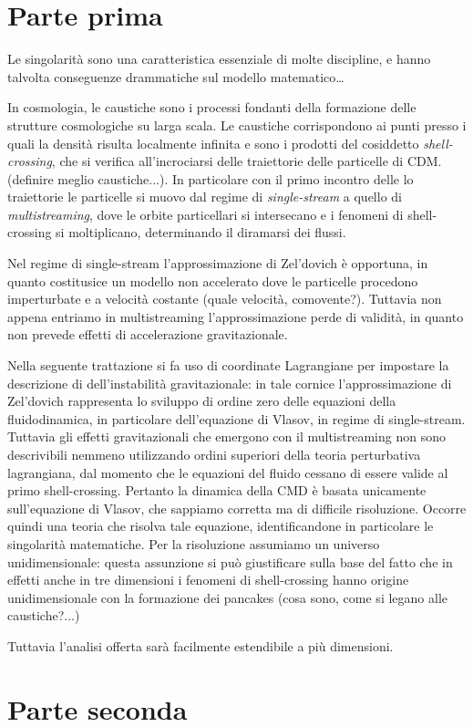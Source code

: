 \section{Parte prima}

Le singolarità sono una caratteristica essenziale di molte discipline, e hanno talvolta conseguenze
drammatiche sul modello matematico\dots

In cosmologia, le caustiche sono i processi fondanti della formazione delle strutture cosmologiche
su larga scala. Le caustiche corrispondono ai punti presso i quali la densità risulta localmente infinita
e sono i prodotti del cosiddetto \textit{shell-crossing}, che si verifica all'incrociarsi delle traiettorie
delle particelle di CDM. (definire meglio caustiche...).
In particolare con il primo incontro delle lo traiettorie le particelle si muovo dal regime di \textit{single-stream}
a quello di \textit{multistreaming}, dove le orbite particellari si intersecano e i fenomeni di shell-crossing
si moltiplicano, determinando il diramarsi dei flussi.

Nel regime di single-stream l'approssimazione di Zel'dovich è opportuna, in quanto costitusice un modello non
accelerato dove le particelle procedono imperturbate e a velocità costante (quale velocità, comovente?).
Tuttavia non appena entriamo in multistreaming l'approssimazione perde di validità, in quanto non prevede
effetti di accelerazione gravitazionale.

Nella seguente trattazione si fa uso di coordinate Lagrangiane per impostare la descrizione di dell'instabilità
gravitazionale: in tale cornice l'approssimazione di Zel'dovich rappresenta lo sviluppo di ordine zero delle
equazioni della fluidodinamica, in particolare dell'equazione di Vlasov, in regime di single-stream.
Tuttavia gli effetti gravitazionali che emergono con il multistreaming non sono descrivibili nemmeno utilizzando
ordini superiori della teoria perturbativa lagrangiana, dal momento che le equazioni del fluido cessano di essere
valide al primo shell-crossing. Pertanto la dinamica della CMD è basata unicamente sull'equazione di Vlasov, che 
sappiamo corretta ma di difficile risoluzione. Occorre quindi una teoria che risolva tale equazione, identificandone
in particolare le singolarità matematiche. Per la risoluzione assumiamo un universo unidimensionale: questa assunzione
si può giustificare sulla base del fatto che in effetti anche in tre dimensioni i fenomeni di shell-crossing hanno 
origine unidimensionale con la formazione dei pancakes (cosa sono, come si legano alle caustiche?...)

Tuttavia l'analisi offerta sarà facilmente estendibile a più dimensioni.

\section{Parte seconda}



